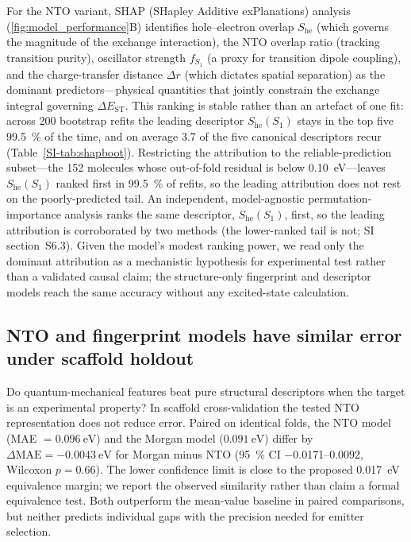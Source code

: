 For the NTO variant, SHAP (SHapley Additive exPlanations) analysis
(\cref{fig:model_performance}B) identifies
hole--electron overlap $S_\text{he}$ (which governs the magnitude of the exchange interaction), the NTO overlap ratio (tracking transition purity), oscillator strength
$f_{S_1}$ (a proxy for transition dipole coupling), and the charge-transfer distance $\Delta r$ (which dictates spatial separation) as the dominant
predictors---physical quantities that jointly constrain the exchange integral governing
$\Delta E_\text{ST}$. This ranking is stable rather than an artefact of one fit:
across \num{200} bootstrap refits the leading descriptor $S_\text{he}(S_1)$ stays
in the top five \qty{99.5}{\percent} of the time, and on average \num{3.7} of the
five canonical descriptors recur (Table~\ref{SI-tab:shapboot}). Restricting the attribution to
the reliable-prediction subset---the \num{152} molecules whose out-of-fold residual is
below \qty{0.10}{\electronvolt}---leaves $S_\text{he}(S_1)$ ranked first in
\qty{99.5}{\percent} of refits, so the leading attribution does not rest on the
poorly-predicted tail. An independent, model-agnostic permutation-importance analysis ranks the same
descriptor, $S_\text{he}(S_1)$, first, so the leading attribution is corroborated by
two methods (the lower-ranked tail is not; SI section~S6.3). Given the model's modest
ranking power, we read only the dominant attribution as a mechanistic hypothesis for
experimental test rather than a validated causal claim; the structure-only
fingerprint and descriptor models reach the same accuracy without any excited-state
calculation.

\subsection{NTO and fingerprint models have similar error under scaffold holdout}\label{subsec:nto_null}

Do quantum-mechanical features beat pure structural descriptors when the target is an
experimental property? In scaffold cross-validation the tested NTO representation
does not reduce error. Paired on identical folds, the NTO model (MAE
$= \qty{0.096}{\electronvolt}$) and the Morgan model
($\qty{0.091}{\electronvolt}$) differ by
$\Delta\text{MAE} = \qty{-0.0043}{\electronvolt}$ for Morgan minus NTO
(\qty{95}{\percent} CI \numrange{-0.0171}{+0.0092}, Wilcoxon $p = 0.66$).
The lower confidence limit is close to the proposed
\qty{0.017}{\electronvolt} equivalence margin; we report the observed
similarity rather than claim a formal equivalence test. Both outperform the
mean-value baseline in paired comparisons, but neither predicts individual
gaps with the precision needed for emitter selection.


